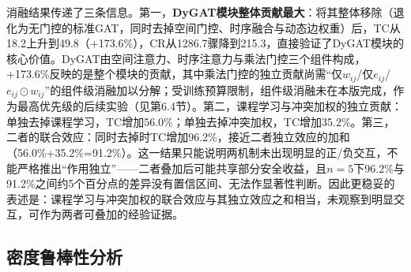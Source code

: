 \documentclass[12pt,a4paper,UTF8]{ctexart}
\begin{document}
\begin{table}[H]
    \centering
    \caption{消融实验（$n=5$）}
    \label{tab:ablation}
\end{table}

消融结果传递了三条信息。第一，\textbf{DyGAT模块整体贡献最大}：将其整体移除（退化为无门控的标准GAT，同时去掉空间门控、时序融合与动态边权重）后，TC从18.2上升到49.8（+173.6\%），CR从1286.7骤降到215.3，直接验证了DyGAT模块的核心价值。DyGAT由空间注意力、时序注意力与乘法门控三个组件构成，+173.6\%反映的是整个模块的贡献，其中乘法门控的独立贡献尚需“仅$w_{ij}$/仅$e_{ij}$/$e_{ij}\odot w_{ij}$”的组件级消融加以分解；受训练预算限制，组件级消融未在本版完成，作为最高优先级的后续实验（见第6.4节）。第二，课程学习与冲突加权的独立贡献：单独去掉课程学习，TC增加56.0\%；单独去掉冲突加权，TC增加35.2\%。第三，二者的联合效应：同时去掉时TC增加96.2\%，接近二者独立效应的加和（56.0\%+35.2\%=91.2\%）。这一结果只能说明两机制未出现明显的正/负交互，不能严格推出“作用独立”——二者叠加后可能共享部分安全收益，且$n=5$下96.2\%与91.2\%之间约5个百分点的差异没有置信区间、无法作显著性判断。因此更稳妥的表述是：课程学习与冲突加权的联合效应与其独立效应之和相当，未观察到明显交互，可作为两者可叠加的经验证据。

\subsection{密度鲁棒性分析}
\end{document}
